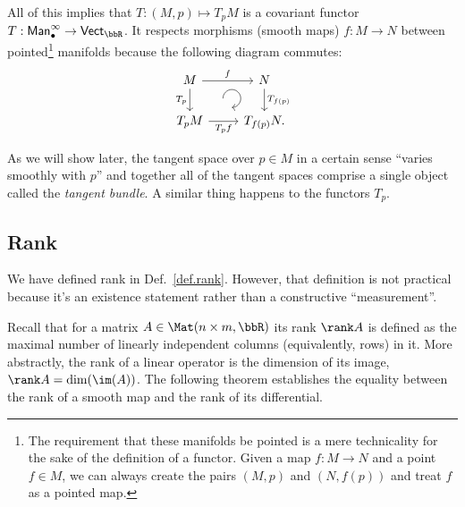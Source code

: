 All of this implies that $T:(M,p)\mapsto T_p M$ is a covariant functor $T:\mathsf{Man}_\bullet^\infty\to \mathsf{Vect}_\bbR$. It respects morphisms (smooth maps) $f:M\to N$ between pointed\footnote{The requirement that these manifolds be pointed is a mere technicality for the sake of the definition of a functor. Given a map $f:M\to N$ and a point $f\in M$, we can always create the pairs $(M,p)$ and $(N,f(p))$ and treat $f$ as a pointed map.} manifolds because the following diagram commutes:
\[
\begin{tikzcd}[every matrix/.append style={name=m},   
    execute at end picture={\draw [<-] ([xshift=-2.6em,yshift=1mm]m-2-2.north) arc[start angle=-90,delta angle=270,radius=0.25cm];}]
   M \arrow[r,"f"]\arrow[d,swap,"T_p"]& N\arrow[d,"T_{f(p)}"] \\
   T_pM\arrow[r,swap, "T_p f"]& T_{f(p)}N.
\end{tikzcd}
\]

As we will show later, the tangent space over $p\in M$ in a certain sense ``varies smoothly with $p$'' and together all of the tangent spaces comprise a single object called the \emph{tangent bundle}. A similar thing happens to the functors $T_p$.

\subsection{Rank}
We have defined rank in Def.~\ref{def.rank}. However, that definition is not practical because it's an existence statement rather than a constructive ``measurement''.

Recall that for a matrix $A\in \Mat(n\times m,\bbR )$ its rank $\rank A$ is defined as the maximal number of linearly independent columns (equivalently, rows) in it. More abstractly, the rank of a linear operator is the dimension of its image, $\rank A=\dim(\im (A))$. The following theorem establishes the equality between the rank of a smooth map and the rank of its differential.

